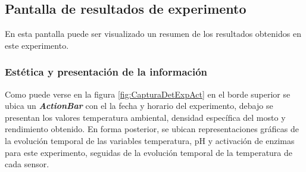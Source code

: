             
            
            
            
        
        \subsection{Pantalla de resultados de experimento}
        \label{DescripPantallaResultadosExperimento}
            \par En esta pantalla puede ser visualizado un resumen de los resultados obtenidos en este experimento.
        
            \subsubsection{Estética y presentación de la información}
            \par Como puede verse en la figura \ref{fig:CapturaDetExpAct} en el borde superior se ubica un \textbf{\textit{\gls{ActionBar}}} con el la fecha y horario del experimento, debajo se presentan los valores temperatura ambiental, densidad específica del mosto y rendimiento obtenido. En forma posterior, se ubican representaciones gráficas de la evolución temporal de las variables temperatura, pH y activación de enzimas para este experimento, seguidas de la evolución temporal de la temperatura de cada sensor.
            
